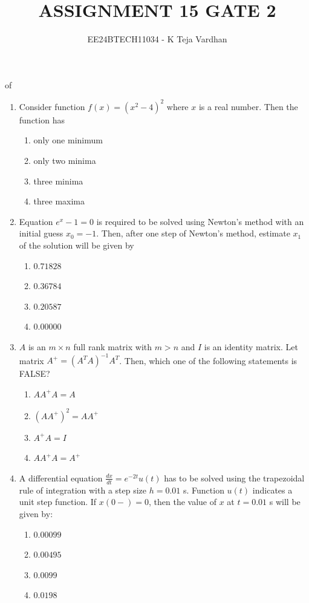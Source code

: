 \documentclass{article}
\newcommand{\brak}[1]{\left( #1 \right)}
\newcommand{\gt}{>}
\begin{document}

\title{ASSIGNMENT 15 GATE 2}of
\author{EE24BTECH11034 - K Teja Vardhan}
{\let\newpage\relax\maketitle}




    \begin{enumerate}
    \item Consider function $f\brak{x} = \brak{x^2 - 4}^2$ where $x$ is a real number. Then the function has 
        \begin{enumerate}
            \item only one minimum
            \item only two minima
            \item three minima
            \item three maxima
        \end{enumerate}

    \item Equation $e^x - 1 = 0$ is required to be solved using Newton's method with an initial guess $x_0 = -1$. Then, after one step of Newton's method, estimate $x_1$ of the solution will be given by  

        \begin{enumerate}
            \item $0.71828$
            \item $0.36784$
            \item $0.20587$
            \item $0.00000$
        \end{enumerate}

    \item $A$ is an $m \times n$ full rank matrix with $m \gt n$ and $I$ is an identity matrix. Let matrix $A^+ = \brak{A^T A}^{-1} A^T$. Then, which one of the following statements is FALSE?
        \begin{enumerate}
            \item $AA^+A = A$
            \item $\brak{AA^+}^2 = AA^+$
            \item $A^+A = I$
            \item $AA^+A = A^+$
        \end{enumerate}

    \item A differential equation $\frac{dx}{dt} = e^{-2t}u\brak{t}$ has to be solved using the trapezoidal rule of integration with a step size $h = 0.01$ s. Function $u\brak{t}$ indicates a unit step function. If $x\brak{0-} = 0$, then the value of $x$ at $t = 0.01$ s will be given by:
        \begin{enumerate}
            \item $0.00099$
            \item $0.00495$
            \item $0.0099$
            \item $0.0198$
        \end{enumerate}


\end{enumerate}
\end{document}
